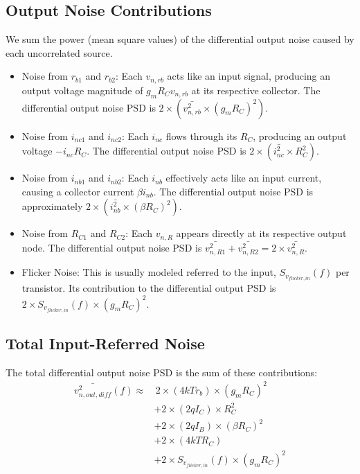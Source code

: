 \documentclass[11pt]{article}
\begin{document}
\subsection{Output Noise Contributions}
We sum the power (mean square values) of the differential output noise caused by each uncorrelated source.
\begin{itemize}
    \item Noise from $r_{b1}$ and $r_{b2}$: Each $v_{n,rb}$ acts like an input signal, producing an output voltage magnitude of $g_m R_C v_{n,rb}$ at its respective collector. The differential output noise PSD is $2 \times (\bar{v^2_{n,rb}} \times (g_m R_C)^2)$.
    \item Noise from $i_{nc1}$ and $i_{nc2}$: Each $i_{nc}$ flows through its $R_C$, producing an output voltage $-i_{nc} R_C$. The differential output noise PSD is $2 \times (\bar{i^2_{nc}} \times R_C^2)$.
    \item Noise from $i_{nb1}$ and $i_{nb2}$: Each $i_{nb}$ effectively acts like an input current, causing a collector current $\beta i_{nb}$. The differential output noise PSD is approximately $2 \times (\bar{i^2_{nb}} \times (\beta R_C)^2)$.
    \item Noise from $R_{C1}$ and $R_{C2}$: Each $v_{n,R}$ appears directly at its respective output node. The differential output noise PSD is $\bar{v^2_{n,R1}} + \bar{v^2_{n,R2}} = 2 \times \bar{v^2_{n,R}}$.
    \item Flicker Noise: This is usually modeled referred to the input, $S_{v_{flicker,in}}(f)$ per transistor. Its contribution to the differential output PSD is $2 \times S_{v_{flicker,in}}(f) \times (g_m R_C)^2$.
\end{itemize}

\subsection{Total Input-Referred Noise}
The total differential output noise PSD is the sum of these contributions:
\begin{equation}
\begin{split}
    \bar{v^2_{n,out,diff}}(f) \approx & \, 2 \times (4 k T r_b) \times (g_m R_C)^2 \\
                                      & + 2 \times (2 q I_C) \times R_C^2 \\
                                      & + 2 \times (2 q I_B) \times (\beta R_C)^2 \\
                                      & + 2 \times (4 k T R_C) \\
                                      & + 2 \times S_{v_{flicker,in}}(f) \times (g_m R_C)^2
\end{split}
\end{equation}
\end{document}
